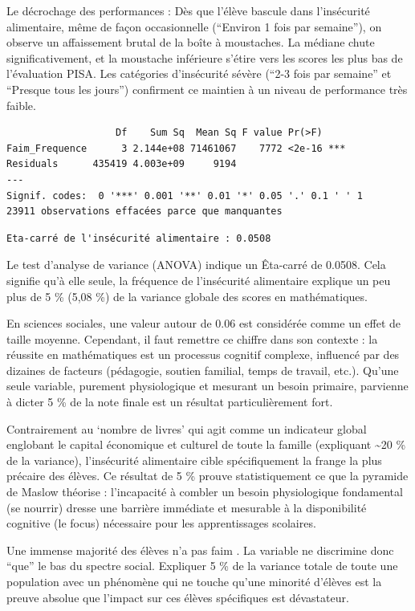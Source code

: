 \documentclass[
  french,
  11pt,
  a4paper,
]{report}
\begin{document}
Le décrochage des performances : Dès que l'élève bascule dans
l'insécurité alimentaire, même de façon occasionnelle (``Environ 1 fois
par semaine''), on observe un affaissement brutal de la boîte à
moustaches. La médiane chute significativement, et la moustache
inférieure s'étire vers les scores les plus bas de l'évaluation PISA.
Les catégories d'insécurité sévère (``2-3 fois par semaine'' et
``Presque tous les jours'') confirment ce maintien à un niveau de
performance très faible.

\begin{verbatim}
                   Df    Sum Sq  Mean Sq F value Pr(>F)    
Faim_Frequence      3 2.144e+08 71461067    7772 <2e-16 ***
Residuals      435419 4.003e+09     9194                   
---
Signif. codes:  0 '***' 0.001 '**' 0.01 '*' 0.05 '.' 0.1 ' ' 1
23911 observations effacées parce que manquantes
\end{verbatim}

\begin{verbatim}
Eta-carré de l'insécurité alimentaire : 0.0508 
\end{verbatim}

Le test d'analyse de variance (ANOVA) indique un Êta-carré de 0.0508.
Cela signifie qu'à elle seule, la fréquence de l'insécurité alimentaire
explique un peu plus de 5 \% (5,08 \%) de la variance globale des scores
en mathématiques.

En sciences sociales, une valeur autour de 0.06 est considérée comme un
effet de taille moyenne. Cependant, il faut remettre ce chiffre dans son
contexte : la réussite en mathématiques est un processus cognitif
complexe, influencé par des dizaines de facteurs (pédagogie, soutien
familial, temps de travail, etc.). Qu'une seule variable, purement
physiologique et mesurant un besoin primaire, parvienne à dicter 5 \% de
la note finale est un résultat particulièrement fort.

Contrairement au `nombre de livres' qui agit comme un indicateur global
englobant le capital économique et culturel de toute la famille
(expliquant \textasciitilde20 \% de la variance), l'insécurité
alimentaire cible spécifiquement la frange la plus précaire des élèves.
Ce résultat de 5 \% prouve statistiquement ce que la pyramide de Maslow
théorise : l'incapacité à combler un besoin physiologique fondamental
(se nourrir) dresse une barrière immédiate et mesurable à la
disponibilité cognitive (le focus) nécessaire pour les apprentissages
scolaires.

Une immense majorité des élèves n'a pas faim . La variable ne discrimine
donc ``que'' le bas du spectre social. Expliquer 5 \% de la variance
totale de toute une population avec un phénomène qui ne touche qu'une
minorité d'élèves est la preuve absolue que l'impact sur ces élèves
spécifiques est dévastateur.
\end{document}
